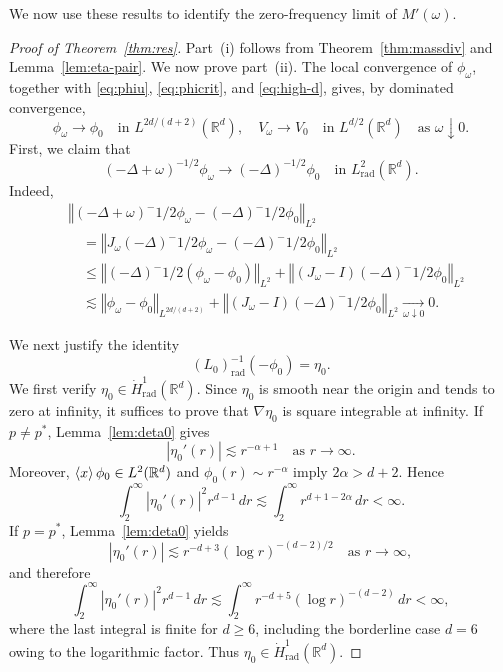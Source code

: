 \documentclass[12pt, a4paper, reqno]{amsart}
\numberwithin{equation}{section}
\theoremstyle{definition}
\theoremstyle{remark}
\newcommand{\R}{\mathbb R}
\def\norm[#1]{{\left\Vert #1 \right\Vert}}
\newcommand{\rad}{\mathrm{rad}}
\begin{document}
We now use these results to identify the zero-frequency limit
of $M'(\omega)$.
\begin{proof}[Proof of Theorem~\ref{thm:res}]
Part~\textup{(i)} follows from Theorem~\ref{thm:massdiv}
and Lemma~\ref{lem:eta-pair}.
We now prove part~\textup{(ii)}.
The local convergence of $\phi_\omega$, together with
\eqref{eq:phiu}, \eqref{eq:phicrit}, and \eqref{eq:high-d}, gives,
by dominated convergence,
\[
  \phi_\omega\to\phi_0\quad\text{in }L^{2d/(d+2)}(\R^d),
  \quad
  V_\omega\to V_0\quad\text{in }L^{d/2}(\R^d)
  \quad\text{as }\omega\downarrow0.
\]
First, we claim that
\begin{equation}\label{eq:hconv}
  (-\Delta+\omega)^{-1/2}\phi_\omega
  \to
  (-\Delta)^{-1/2}\phi_0
  \quad\text{in }L^2_{\rad}(\R^d).
\end{equation}
Indeed,
\begin{align*}
  &\norm[
    (-\Delta+\omega)^{-1/2}\phi_\omega
    -(-\Delta)^{-1/2}\phi_0
  ]_{L^2}
  \\
  &\quad=
  \norm[
    J_\omega(-\Delta)^{-1/2}\phi_\omega
    -(-\Delta)^{-1/2}\phi_0
  ]_{L^2}
  \\
  &\quad\le
  \norm[
    (-\Delta)^{-1/2}(\phi_\omega-\phi_0)
  ]_{L^2}
  +\norm[
    (J_\omega-I)(-\Delta)^{-1/2}\phi_0
  ]_{L^2}
  \\
  &\quad\lesssim
  \norm[\phi_\omega-\phi_0]_{L^{2d/(d+2)}}
  +\norm[
    (J_\omega-I)(-\Delta)^{-1/2}\phi_0
  ]_{L^2}
  \xrightarrow[\omega\downarrow0]{}0.
\end{align*}

We next justify the identity
\begin{equation}\label{eq:L0inv}
  (L_0)_{\rad}^{-1}(-\phi_0)=\eta_0.
\end{equation}
We first verify $\eta_0\in\dot H^1_{\rad}(\R^d)$. Since
$\eta_0$ is smooth near the origin and tends to zero at infinity,
it suffices to prove that $\nabla\eta_0$ is square integrable at infinity.
If $p\ne p^*$, Lemma~\ref{lem:deta0} gives
\[
  |\eta_0'(r)|\lesssim r^{-\alpha+1}
  \quad\text{as }r\to\infty.
\]
Moreover, $\braket{x}\phi_0\in L^2(\R^d)$ and
$\phi_0(r)\sim r^{-\alpha}$ imply $2\alpha>d+2$. Hence
\[
  \int_2^\infty |\eta_0'(r)|^2r^{d-1}\,dr
  \lesssim
  \int_2^\infty r^{d+1-2\alpha}\,dr
  <\infty.
\]
If $p=p^*$, Lemma~\ref{lem:deta0} yields
\[
  |\eta_0'(r)|
  \lesssim
  r^{-d+3}(\log r)^{-(d-2)/2}
  \quad\text{as }r\to\infty,
\]
and therefore
\[
  \int_2^\infty |\eta_0'(r)|^2r^{d-1}\,dr
  \lesssim
  \int_2^\infty
  r^{-d+5}(\log r)^{-(d-2)}\,dr
  <\infty,
\]
where the last integral is finite for $d\ge6$, including the borderline
case $d=6$ owing to the logarithmic factor. Thus
$\eta_0\in\dot H^1_{\rad}(\R^d)$.


\end{proof}
\end{document}
